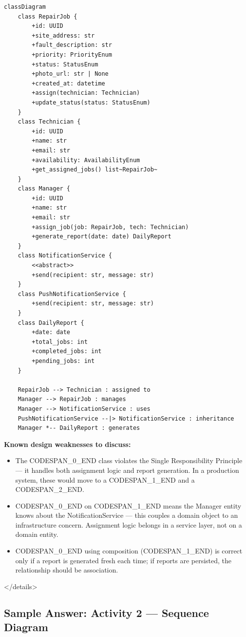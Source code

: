 \documentclass[11pt,a4paper]{book}
\begin{document}
\begin{lstlisting}
classDiagram
    class RepairJob {
        +id: UUID
        +site_address: str
        +fault_description: str
        +priority: PriorityEnum
        +status: StatusEnum
        +photo_url: str | None
        +created_at: datetime
        +assign(technician: Technician)
        +update_status(status: StatusEnum)
    }
    class Technician {
        +id: UUID
        +name: str
        +email: str
        +availability: AvailabilityEnum
        +get_assigned_jobs() list~RepairJob~
    }
    class Manager {
        +id: UUID
        +name: str
        +email: str
        +assign_job(job: RepairJob, tech: Technician)
        +generate_report(date: date) DailyReport
    }
    class NotificationService {
        <<abstract>>
        +send(recipient: str, message: str)
    }
    class PushNotificationService {
        +send(recipient: str, message: str)
    }
    class DailyReport {
        +date: date
        +total_jobs: int
        +completed_jobs: int
        +pending_jobs: int
    }

    RepairJob --> Technician : assigned to
    Manager --> RepairJob : manages
    Manager --> NotificationService : uses
    PushNotificationService --|> NotificationService : inheritance
    Manager *-- DailyReport : generates
\end{lstlisting}

\textbf{Known design weaknesses to discuss:}
\begin{itemize}
  \item The CODESPAN\_0\_END class violates the Single Responsibility Principle --- it handles both assignment logic and report generation. In a production system, these would move to a CODESPAN\_1\_END and a CODESPAN\_2\_END.
  \item CODESPAN\_0\_END on CODESPAN\_1\_END means the Manager entity knows about the NotificationService --- this couples a domain object to an infrastructure concern. Assignment logic belongs in a service layer, not on a domain entity.
  \item CODESPAN\_0\_END using composition (CODESPAN\_1\_END) is correct only if a report is generated fresh each time; if reports are persisted, the relationship should be association.
\end{itemize}

</details>

\medskip

\subsection{Sample Answer: Activity 2 --- Sequence Diagram}
\end{document}
